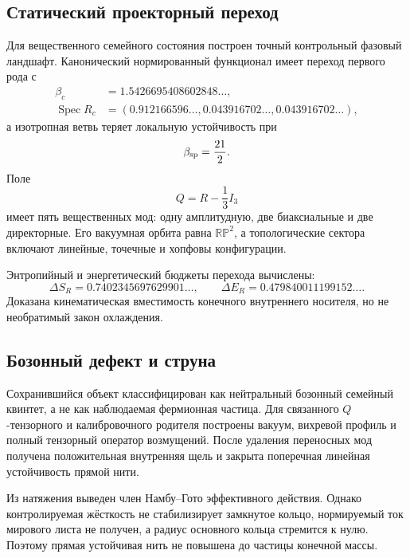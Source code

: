 \subsection{Статический проекторный переход}

Для вещественного семейного состояния построен точный контрольный
фазовый ландшафт. Канонический нормированный функционал имеет переход
первого рода с
\begin{align}
 \beta_c&=1.5426695408602848\ldots,\\
 \operatorname{Spec}R_c
 &=(0.912166596\ldots,0.043916702\ldots,
 0.043916702\ldots),
\end{align}
а изотропная ветвь теряет локальную устойчивость при
\begin{equation}
 \beta_{\rm sp}=\frac{21}{2}.
\end{equation}
Поле
\begin{equation}
 Q=R-\frac13I_3
\end{equation}
имеет пять вещественных мод: одну амплитудную, две биаксиальные и две
директорные. Его вакуумная орбита равна $\mathbb{RP}^2$, а топологические
сектора включают линейные, точечные и хопфовы конфигурации.

Энтропийный и энергетический бюджеты перехода вычислены:
\begin{equation}
 \Delta S_R=0.7402345697629901\ldots,
 \qquad
 \Delta E_R=0.479840011199152\ldots.
\end{equation}
Доказана кинематическая вместимость конечного внутреннего носителя, но не
необратимый закон охлаждения.

\subsection{Бозонный дефект и струна}

Сохранившийся объект классифицирован как нейтральный бозонный семейный
квинтет, а не как наблюдаемая фермионная частица. Для связанного
$Q$-тензорного и калибровочного родителя построены вакуум, вихревой
профиль и полный тензорный оператор возмущений. После удаления
переносных мод получена положительная внутренняя щель и закрыта поперечная
линейная устойчивость прямой нити.

Из натяжения выведен член Намбу--Гото эффективного действия. Однако
контролируемая жёсткость не стабилизирует замкнутое кольцо, нормируемый
ток мирового листа не получен, а радиус основного кольца стремится к
нулю. Поэтому прямая устойчивая нить не повышена до частицы конечной
массы.

